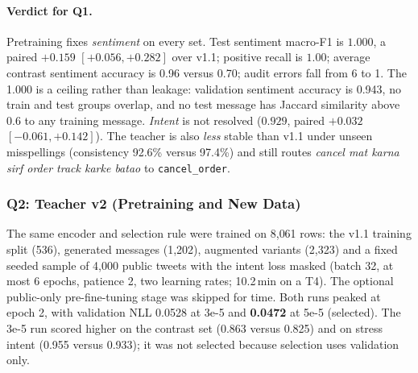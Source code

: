 \documentclass[11pt,a4paper]{article}
\theoremstyle{remark}
\newcommand{\lbl}[1]{\texttt{#1}}                      %
\newcommand{\hi}[1]{\textit{#1}}                       %
\begin{document}
\paragraph{Verdict for Q1.} Pretraining fixes \emph{sentiment} on every set. Test sentiment macro-F1 is $1.000$, a paired $+0.159$ $[+0.056, +0.282]$ over v1.1; positive recall is $1.00$; average contrast sentiment accuracy is 0.96 versus 0.70; audit errors fall from 6 to 1. The 1.000 is a ceiling rather than leakage: validation sentiment accuracy is 0.943, no train and test groups overlap, and no test message has Jaccard similarity above 0.6 to any training message. \emph{Intent} is not resolved ($0.929$, paired $+0.032$ $[-0.061, +0.142]$). The teacher is also \emph{less} stable than v1.1 under unseen misspellings (consistency 92.6\% versus 97.4\%) and still routes \hi{cancel mat karna sirf order track karke batao} to \lbl{cancel\_order}.

\subsubsection{Q2: Teacher v2 (Pretraining and New Data)}
\label{sec:v12teacher2}
The same encoder and selection rule were trained on 8{,}061 rows: the v1.1
training split (536), generated messages (1{,}202), augmented variants (2{,}323)
and a fixed seeded sample of 4{,}000 public tweets with the intent loss masked
(batch 32, at most 6 epochs, patience 2, two learning rates; 10.2\,min on a T4).
The optional public-only pre-fine-tuning stage was skipped for time. Both runs
peaked at epoch 2, with validation NLL 0.0528 at 3e-5 and \textbf{0.0472} at
5e-5 (selected). The 3e-5 run scored higher on the contrast set (0.863 versus
0.825) and on stress intent (0.955 versus 0.933); it was not selected because
selection uses validation only.
\end{document}
